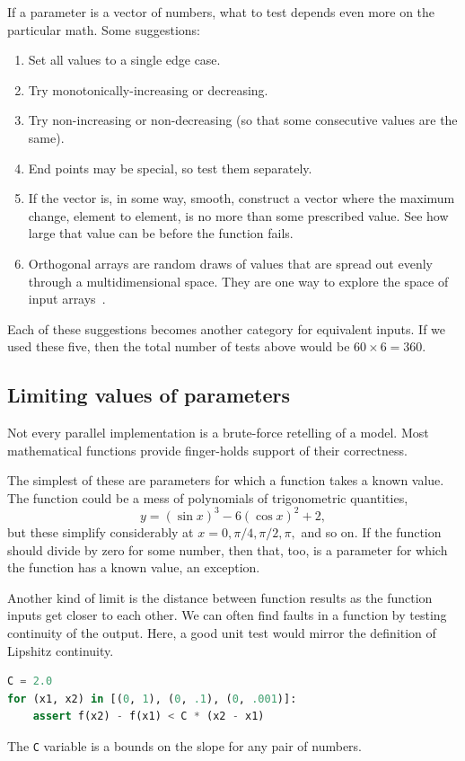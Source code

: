 \documentclass[fleqn,10pt]{olplainarticle}
\begin{document}
If a parameter is a vector of numbers, what to test depends
even more on the particular math. Some suggestions:
\begin{enumerate}
    \item Set all values to a single edge case.
    \item Try monotonically-increasing or decreasing.
    \item Try non-increasing or non-decreasing (so that some
    consecutive values are the same).
    \item End points may be special, so test them separately.
    \item If the vector is, in some way, smooth, construct
    a vector where the maximum change, element to element, is no
    more than some prescribed value. See how large that value can
    be before the function fails.
    \item Orthogonal arrays are random draws of values that
    are spread out evenly through a multidimensional space.
    They are one way to explore the space of input arrays~\citep{Owen1992}.
\end{enumerate}
Each of these suggestions becomes another category for
equivalent inputs. If we used these five, then the total
number of tests above would be $60\times 6 = 360$.


\subsection{Limiting values of parameters}\label{sec:limits}

Not every parallel implementation is a brute-force retelling
of a model. Most mathematical functions provide finger-holds
support of their correctness.

The simplest of these are parameters for which a function
takes a known value. The function could be a mess of
polynomials of trigonometric quantities,
\begin{equation}
  y = (\sin x)^3 - 6 (\cos x)^2 + 2,
\end{equation}
but these simplify considerably at $x=0, \pi/4, \pi/2, \pi,$
and so on. If the function should divide by zero for some
number, then that, too, is a parameter for which the function
has a known value, an exception.

Another kind of limit is the distance between function results
as the function inputs get closer to each other. We can often
find faults in a function by testing continuity of the output.
Here, a good unit test would mirror the definition of Lipshitz continuity.
\begin{lstlisting}[language=python]
C = 2.0
for (x1, x2) in [(0, 1), (0, .1), (0, .001)]:
    assert f(x2) - f(x1) < C * (x2 - x1)
\end{lstlisting}
The \lstinline!C! variable is a bounds on the slope for any
pair of numbers.
\end{document}

